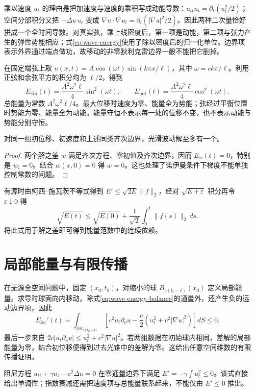 乘以速度 $u_t$ 的理由是把加速度与速度的乘积写成动能导数：$u_{tt}u_t=\partial_t(u_t^2/2)$；空间分部积分又把 $-\Delta u\,u_t$ 变成 $\nabla u\cdot\nabla u_t=\partial_t(|\nabla u|^2/2)$。因此两种二次量恰好拼成一个全时间导数。对真实弦，乘上线密度后，第一项是动能，第二项与张力产生的弹性势能相应；式\eqref{eq:wave-energy}使用了除以密度后的归一化单位。边界项表示外界通过端点做功，故移动的非零狄利克雷边界一般不能把它删掉。

\begin{example}[能量在两种形式之间交换]
在固定端弦上取 $u(x,t)=A\cos(\omega t)\sin(k\pi x/\ell)$，其中 $\omega=ck\pi/\ell$。利用正弦和余弦平方的积分均为 $\ell/2$，得到
\[
 E_{\mathrm{kin}}(t)=\frac{A^2\omega^2\ell}{4}\sin^2(\omega t),\qquad
 E_{\mathrm{pot}}(t)=\frac{A^2\omega^2\ell}{4}\cos^2(\omega t).
\]
总能量为常数 $A^2\omega^2\ell/4$。最大位移时速度为零、能量全为势能；弦经过平衡位置时势能为零、能量全为动能。能量守恒不表示每一处的位移不变，也不表示动能与势能分别守恒。
\end{example}

\begin{proposition}
对同一组初位移、初速度和上述同类齐次边界，光滑波动解至多有一个。
\end{proposition}
\begin{proof}
两个解之差 $w$ 满足齐次方程、零初值及齐次边界，因而 $E_w(t)=0$，特别是 $w_t=0$。结合 $w(x,0)=0$ 得 $w=0$。这也处理了诺伊曼条件下梯度不能单独控制常数的问题。
\end{proof}
有源时由柯西--施瓦茨不等式得到 $E'\le\sqrt{2E}\|f\|_2$，经对 $\sqrt{E+\varepsilon}$ 积分再令 $\varepsilon\downarrow0$ 得
\[
 \sqrt{E(t)}\le\sqrt{E(0)}+\frac1{\sqrt2}\int_0^t\|f(s)\|_2\,ds.
\]
将此式用于解之差即可得到能量范数中的连续依赖。

\section{局部能量与有限传播}
在无源全空间问题中，固定 $(x_0,t_0)$，对缩小的球 $B_{c(t_0-t)}(x_0)$ 定义局部能量。求导时球面向内移动，除式\eqref{eq:wave-energy-balance}的通量外，还产生负的运动边界项，因此
\[
 E_{\mathrm{loc}}'(t)=\int_{\partial B_{c(t_0-t)}}
 \left[c^2u_t\partial_\nu u-\frac c2(u_t^2+c^2|\nabla u|^2)\right]dS\le0.
\]
最后一步来自 $2c|u_t\partial_\nu u|\le u_t^2+c^2|\nabla u|^2$。若两组数据在初始球内相同，差解的局部能量为零，结合初位移便得到过去光锥中的差解为零。这给出任意空间维数的有限传播证明。

阻尼方程 $u_{tt}+\gamma u_t-c^2\Delta u=0$ 在零通量边界下满足 $E'=-\gamma\int u_t^2\le0$。该式直接给出单调性；指数衰减还需把速度项与总能量联系起来，不能仅由 $E'\le0$ 推出。

